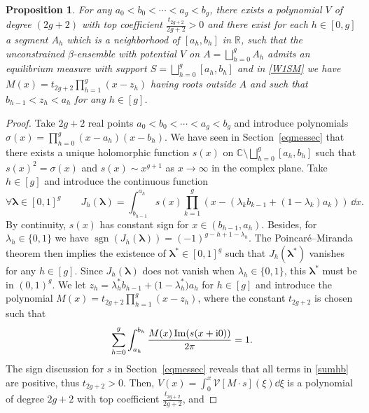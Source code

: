 \documentclass[10pt,a4paper]{amsart}
\numberwithin{equation}{section}
\newtheorem{prop}[Theorem]{Proposition}
 { \theoremstyle{definition}
\newtheorem{Definition}[Theorem]{Definition}
\newtheorem{Note}[Theorem]{Note}
\newtheorem{Example}[Theorem]{Example}
\newtheorem{Remark}[Theorem]{Remark} }
\begin{document}
\begin{prop}
\label{propallhyp} For any $a_0 < b_0 < \cdots < a_g < b_g$, there exists a polynomial $V$ of degree $(2g + 2)$ with top coefficient $\frac{t_{2g + 2}}{2g + 2} > 0$ and there exist for each $h \in [0,g]$ a segment $A_h$ which is a neighborhood of $[a_h,b_h]$ in $\mathbb{R}$, such that the unconstrained $\beta$-ensemble with potential $V$ on $A = \bigsqcup_{h = 0}^{g} A_h$ admits an equilibrium measure with support $S = \bigsqcup_{h = 0}^{g} [a_h,b_h]$ and in \eqref{W1SM} we have $M(x) = t_{2g + 2}\prod_{h = 1}^g (x - z_h)$ having roots outside $A$ and such that $b_{h - 1} < z_h < a_h$ for any $h \in [g]$.
\end{prop}
\begin{proof} Take $2g + 2$ real points $a_0 < b_0 < \cdots < a_g < b_g$ and introduce polynomials $\sigma(x) = \prod_{h = 0}^{g}(x - a_h)(x - b_h)$. We have seen in Section~\ref{eqmessec} that there exists a unique holomorphic function $s(x)$ on $\mathbb{C} \setminus \bigsqcup_{h = 0}^{g} [a_h,b_h]$ such that $s(x)^2 = \sigma(x)$ and $s(x) \sim x^{g + 1}$
as $x \rightarrow \infty$ in the complex plane. Take $h \in [g]$ and introduce the continuous function
\[
\forall \boldsymbol{\lambda}\in [0,1]^{g}\qquad J_h(\boldsymbol{\lambda}) = \int_{b_{h - 1}}^{a_h} s(x) \prod_{k = 1}^{g}(x - (\lambda_k b_{k - 1} + (1 - \lambda_k) a_k))\,\dd x.
\]
By continuity, $s(x)$ has constant sign for $x \in (b_{h - 1},a_h)$. Besides, for $\lambda_h \in \{0,1\}$ we have $\operatorname{sgn}(J_{h}(\boldsymbol{\lambda})) = (-1)^{g - h + 1 - \lambda_h}$. The Poincar\'e--Miranda theorem \cite{Miranda} then implies the existence of $\boldsymbol{\lambda}^* \in [0,1]^{g}$ such that $J_h(\boldsymbol{\lambda}^*)$ vanishes for any $h \in [g]$. Since $J_h(\boldsymbol{\lambda})$ does not vanish when $\lambda_h \in \{0,1\}$, this $\boldsymbol{\lambda}^*$ must be in $(0,1)^{g}$. We let $z_h = \lambda_h^*b_{h - 1} + \big(1 - \lambda_h^*\big)a_h$ for $h \in [g]$ and introduce the polynomial $M(x) = t_{2g + 2}\prod_{h = 1}^{g} (x - z_h)$, where the constant $t_{2g + 2}$ is chosen such that
\begin{equation}
\label{sumhb}
\sum_{h = 0}^{g} \int_{a_h}^{b_h} \frac{M(x) \operatorname{Im}(s(x + {\rm i}0))}{2\pi} = 1.
\end{equation}
The sign discussion for $s$ in Section~\ref{eqmessec} reveals that all terms in \eqref{sumhb} are positive, thus $t_{2g + 2} > 0$. Then, $V(x) = \int_{0}^{x} \mathcal{V}[M \cdot s](\xi) \dd \xi$ is a polynomial of degree $2g + 2$ with top coefficient $\frac{t_{2g + 2}}{2g + 2}$, and

\end{proof}
\end{document}
